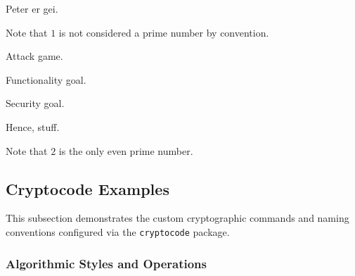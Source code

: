 \begin{aside}
    Peter er gei.
\end{aside}
\begin{remark}
    Note that $1$ is not considered a prime number by convention.
\end{remark}
\begin{attackgame}
    Attack game.
\end{attackgame}
\begin{functionalitygoal}
    Functionality goal.
\end{functionalitygoal}
\begin{securitygoal}
    Security goal.
\end{securitygoal}

\begin{resultbox}
    Hence, stuff.
\end{resultbox}
\begin{remarkbox}
    Note that $2$ is the only even prime number.
\end{remarkbox}

\subsection{Cryptocode Examples}

This subsection demonstrates the custom cryptographic commands and naming conventions configured via the \texttt{cryptocode} package.

\subsubsection{Algorithmic Styles and Operations}

